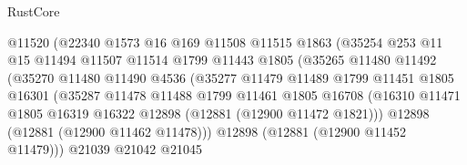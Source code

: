 \begin{lexlean}{RustCore}
\begin{coremodule}
                                  @11520
                                  (@22340
                                    @1573
                                    @16
                                    @169
                                    @11508
                                    @11515
                                    @1863
                                    (@35254
                                      @253
                                      @11
                                      @15
                                      @11494
                                      @11507
                                      @11514
                                      @1799
                                      @11443
                                      @1805
                                      (@35265
                                        @11480
                                        @11492
                                        (@35270
                                          @11480
                                          @11490
                                          @4536
                                          (@35277
                                            @11479
                                            @11489
                                            @1799
                                            @11451
                                            @1805
                                            @16301
                                            (@35287
                                              @11478
                                              @11488
                                              @1799
                                              @11461
                                              @1805
                                              @16708
                                              (@16310
                                                @11471
                                                @1805
                                                @16319
                                                @16322
                                                @12898
                                                (@12881 (@12900 @11472 @1821)))
                                              @12898
                                              (@12881 (@12900 @11462 @11478)))
                                            @12898
                                            (@12881 (@12900 @11452 @11479)))
                                          @21039
                                          @21042
                                          @21045

\end{coremodule}
\end{lexlean}
